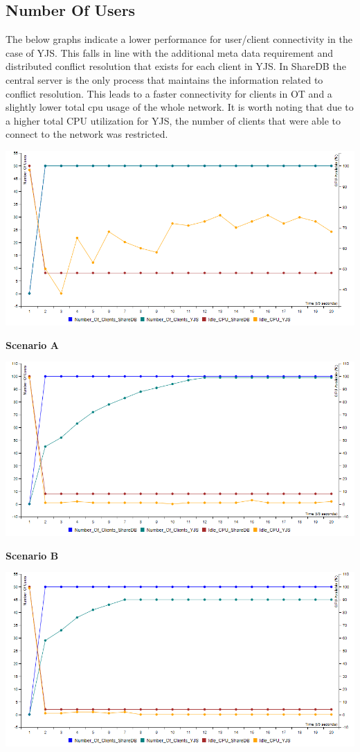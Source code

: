\documentclass[9pt, titlepage]{article}
\begin{document}
  \subsection{Number Of Users}
  The below graphs indicate a lower performance for user/client connectivity in the case of YJS.
  This falls in line with the additional meta data requirement and distributed conflict resolution that exists for each client in YJS.
  In ShareDB the central server is the only process that maintains the information related to conflict resolution.
  This leads to a faster connectivity for clients in OT and a slightly lower total cpu usage of the whole network.
  It is worth noting that due to a higher total CPU utilization for YJS, the number of clients that were able to 
  connect to the network was restricted. 
  \begin{center}
    \includegraphics[scale=0.48]{scenario_a/users.png}

    \textbf{Scenario A}
    
    \includegraphics[scale=0.48]{scenario_b/users.png}
    
    \textbf{Scenario B}
    
    \includegraphics[scale=0.48]{scenario_c/users.png}
    

\end{center}
\end{document}
